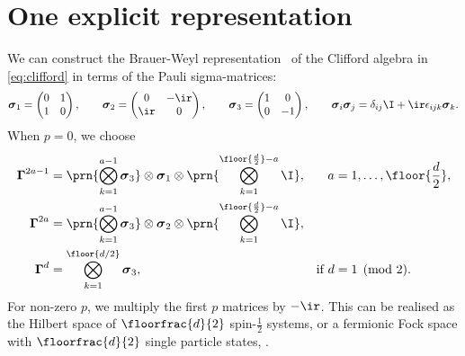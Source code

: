 \documentclass[11pt]{article}
\newcommand{\Gammab}{\boldsymbol{\Gamma}}
\newcommand{\sigmab}{\boldsymbol{\sigma}}
\begin{document}

\section{One explicit representation}\label{sec:explicit}

We can construct the Brauer-Weyl representation~\cite{brauer1935spinors} of the Clifford algebra in \cref{eq:clifford} in terms of the Pauli sigma-matrices:
%
\begin{equation}\label{eq:paulisigma}
  \sigmab_1 = \begin{pmatrix}
                0 & 1 \\
                1 & 0 \\
              \end{pmatrix}
  , \qquad
  \sigmab_2 = \begin{pmatrix}
                0   & -\ir \\
                \ir & 0    \\
              \end{pmatrix}
  , \qquad
  \sigmab_3 = \begin{pmatrix}
                1 & 0  \\
                0 & -1 \\
              \end{pmatrix}
  , \qquad
  \sigmab_i \sigmab_j = \delta_{ij} \I + \ir \epsilon_{ijk} \sigmab_k.
\end{equation}
%
When \(p=0\), we choose
%
\begin{equation}\label{eq:explicit}
\begin{aligned}
  \Gammab^{2a-1} &= \prn{\bigotimes_{k=1}^{a-1} \sigmab_3}
                    \otimes \sigmab_1 \otimes
                    \prn{\bigotimes_{k=1}^{\floor{\frac{d}{2}}-a} \I}, &
    a &= 1, \ldots, \floor{\frac{d}{2}}, \\
  \Gammab^{2a} &= \prn{\bigotimes_{k=1}^{a-1} \sigmab_3}
                  \otimes \sigmab_2 \otimes
                  \prn{\bigotimes_{k=1}^{\floor{\frac{d}{2}}-a} \I}, \\
  \Gammab^d &= \bigotimes_{k=1}^{\floor{d/2}} \sigmab_3, &
    \text{if }
    d &= 1 \pmod 2.
\end{aligned}
\end{equation}
%
For non-zero \(p\), we multiply the first \(p\) matrices by \(-\ir\).
This can be realised as the Hilbert space of \(\floorfrac{d}{2}\) spin-\(\frac{1}{2}\) systems, or a fermionic Fock space with \(\floorfrac{d}{2}\) single particle states,
\cite{strathdee1986extended,Strathdee:1987jr}.
\end{document}
